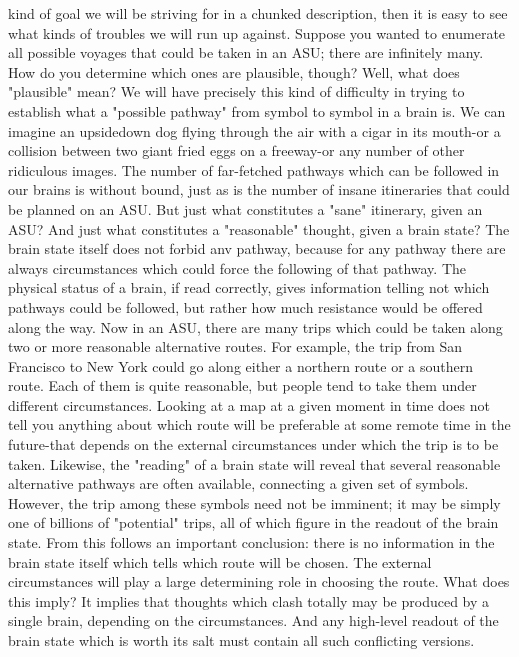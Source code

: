 kind of goal we will be striving for in a chunked description, then it is easy to see what
kinds of troubles we will run up against.
         Suppose you wanted to enumerate all possible voyages that could be taken in an
ASU; there are infinitely many. How do you determine which ones are plausible, though?
Well, what does "plausible" mean? We will have precisely this kind of difficulty in trying
to establish what a "possible pathway" from symbol to symbol in a brain is. We can
imagine an upsidedown dog flying through the air with a cigar in its mouth-or a collision
between two giant fried eggs on a freeway-or any number of other ridiculous images. The
number of far-fetched pathways which can be followed in our brains is without bound,
just as is the number of insane itineraries that could be planned on an ASU. But just what
constitutes a "sane" itinerary, given an ASU? And just what constitutes a "reasonable"
thought, given a brain state? The brain state itself does not forbid anv pathway, because
for any pathway there are always circumstances which could force the following of that
pathway. The physical status of a brain, if read correctly, gives information telling not
which pathways could be followed, but rather how much resistance would be offered
along the way.
         Now in an ASU, there are many trips which could be taken along two or more
reasonable alternative routes. For example, the trip from San Francisco to New York
could go along either a northern route or a southern route. Each of them is quite
reasonable, but people tend to take them under different circumstances. Looking at a map
at a given moment in time does not tell you anything about which route will be preferable
at some remote time in the future-that depends on the external circumstances under which
the trip is to be taken. Likewise, the "reading" of a brain state will reveal that several
reasonable alternative pathways are often available, connecting a given set of symbols.
However, the trip among these symbols need not be imminent; it may be simply one of
billions of "potential" trips, all of which figure in the readout of the brain state. From this
follows an important conclusion: there is no information in the brain state itself which
tells which route will be chosen. The external circumstances will play a large determining
role in choosing the route.
         What does this imply? It implies that thoughts which clash totally may be
produced by a single brain, depending on the circumstances. And any high-level readout
of the brain state which is worth its salt must contain all such conflicting versions.

